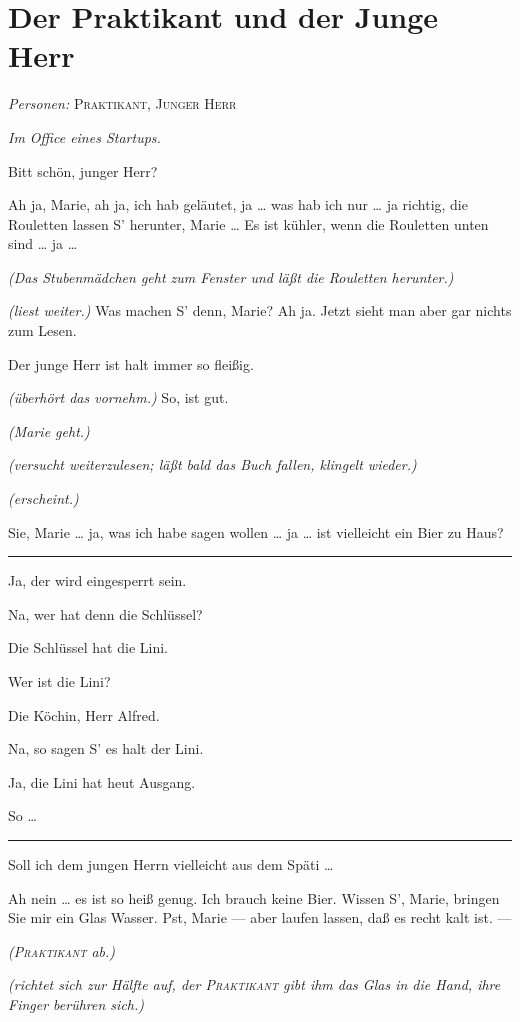 \documentclass[
	final,
	a4paper,
	ngerman,
	mpinclude = true, %
	twoside = true,
	open = right,
	cleardoublepage = plain,
	DIV = 13,
	BCOR = 1cm,
	titlepage = firstiscover,
	]{scrbook}
\newcommand{\scene}{\section}
\newcommand{\direction}[1]{\textit{(#1)}}
\newcommand{\setting}[1]{\vspace{-0.5\baselineskip}\centering\textit{#1}}
\newenvironment{deletion}{%
		\vspace{0.25\baselineskip}
		\hrule
		\vspace{0.25\baselineskip}
		\color{darkgray}
	}{
		\color{black}
		\vspace{0.25\baselineskip}
		\hrule 
		\vspace{0.25\baselineskip}
	}
\newcommand{\characterlist}[1]{{\begin{center}\textit{Personen:} #1\end{center}}}
\newcommand{\thecharacter}[1]{\textup{\textsc{#1}}\xspace}
\newcommand{\thepraktikant}{\thecharacter{Praktikant}}
\newcommand{\theherr}{\thecharacter{Junger Herr}}
\newcommand{\character}[1]{\item[#1:]}
\newcommand{\praktikant}{\character{\thepraktikant}}
\newcommand{\herr}{\character{\theherr}}
\begin{document}
\scene{Der Praktikant und der Junge Herr}
\characterlist{\thepraktikant, \theherr}
\setting{Im Office eines Startups.}
\begin{play}
	\praktikant
	Bitt schön, junger Herr?

	\herr
	Ah ja, Marie, ah ja, ich hab geläutet, ja \ldots{} was hab ich nur \ldots{} ja richtig, die Rouletten lassen S' herunter, Marie \ldots{} Es ist kühler, wenn die Rouletten unten sind \ldots{} ja \ldots{}

	\direction{Das Stubenmädchen geht zum Fenster und läßt die Rouletten herunter.}

	\herr
	\direction{liest weiter.} Was machen S' denn, Marie? Ah ja. Jetzt sieht man aber gar nichts zum Lesen.

	\praktikant
	Der junge Herr ist halt immer so fleißig.

	\herr
	\direction{überhört das vornehm.} So, ist gut.

	\direction{Marie geht.}

	\herr
	\direction{versucht weiterzulesen; läßt bald das Buch fallen, klingelt wieder.}

	\praktikant
	\direction{erscheint.}

	\herr
	Sie, Marie \ldots{} ja, was ich habe sagen wollen \ldots{} ja \ldots{} ist vielleicht ein Bier zu Haus?

	\begin{deletion}
	\praktikant
	Ja, der wird eingesperrt sein.

	\herr
	Na, wer hat denn die Schlüssel?

	\praktikant
	Die Schlüssel hat die Lini.

	\herr
	Wer ist die Lini?

	\praktikant
	Die Köchin, Herr Alfred.

	\herr
	Na, so sagen S' es halt der Lini.

	\praktikant
	Ja, die Lini hat heut Ausgang.

	\herr
	So \ldots{}
	\end{deletion}

	\praktikant
	Soll ich dem jungen Herrn vielleicht aus dem Späti \ldots{}

	\herr
	Ah nein \ldots{} es ist so heiß genug. Ich brauch keine Bier. Wissen S', Marie, bringen Sie mir ein Glas Wasser. Pst, Marie --- aber laufen lassen, daß es recht kalt ist. ---

	\direction{\thepraktikant{} ab.}

	\herr
	\direction{richtet sich zur Hälfte auf, der \thepraktikant{} gibt ihm das Glas in die Hand, ihre Finger berühren sich.}


\end{play}
\end{document}
